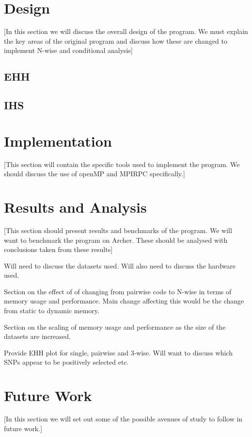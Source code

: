 \documentclass[a4paper,12pt]{report}
\begin{document}
\chapter{Design}
[In this section we will discuss the overall design of the program. We must explain the key areas of the original program and discuss how these are changed to implement N-wise and conditional analysis]

\section{EHH}


\section{IHS}

\chapter{Implementation}
[This section will contain the specific tools used to implement the program. We should discuss the use of openMP and MPIRPC specifically.]

\chapter{Results and Analysis}
[This section should present results and benchmarks of the program. We will want to benchmark the program on Archer. These should be analysed with conclusions taken from  these results]

Will need to discuss the datasets used. Will also need to discuss the hardware used.

Section on the effect of of changing from pairwise code to N-wise in terms of memory usage and performance. Main change affecting this would be the change from static to dynamic memory.

Section on the scaling of memory usage and performance as the size of the datasets are increased.

Provide EHH plot for single, pairwise and 3-wise. Will want to discuss which SNPs appear to be positively selected etc.


\chapter{Future Work}
[In this section we will set out some of the possible avenues of study to follow in future work.]
\end{document}
